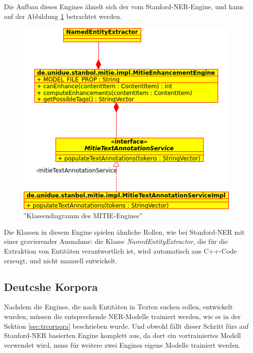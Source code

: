 Die Aufbau dieses Engines ähnelt sich der vom Stanford-NER-Engine, und kann auf der Abbildung \ref{fig:mitieclasses} betrachtet werden.

\begin{figure}[ht]
\centering
\includegraphics[width=\textwidth]{Bilder/mitie-classes.png}
\caption{''Klassendiagramm  des MITIE-Engines''}
\label{fig:mitieclasses}
\end{figure}
Die Klassen in diesem Engine spielen ähnliche Rollen, wie bei Stanford-NER mit einer gravierender Ausnahme: die Klasse \textit{NamedEntityExtractor}, die für die Extraktion von Entitäten verantwortlich ist, wird automatisch aus C++-Code erzeugt, und nicht manuell entwickelt.

\subsection{Deutcshe Korpora} \label{subsec:decor}
Nachdem die Engines, die nach Entitäten in Texten suchen sollen, entwickelt wurden, müssen die entsprechende NER-Modelle trainiert werden, wie es in der Sektion \ref{sec:trcorpora} beschrieben wurde. Und obwohl fällt dieser Schritt fürs auf Stanford-NER basierten Engine komplett aus, da dort ein vortrainiertes Modell verwendet wird, muss für weitere zwei Engines eigene Modelle trainiert werden.


